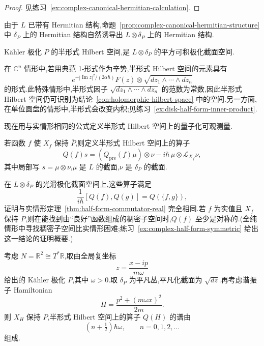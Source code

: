 \begin{proof}
见练习~\ref{ex:complex-canonical-hermitian-calculation}.
\end{proof}

由于 $L$ 已带有 Hermitian 结构,命题~\ref{prop:complex-canonical-hermitian-structure} 中 $\delta_P$ 上的 Hermitian 结构自然诱导出 $L\otimes\delta_P$ 上的 Hermitian 结构.

\begin{definition}
\label{def:half-form-hilbert-space-complex}
Kähler 极化 $P$ 的半形式 Hilbert 空间,是 $L\otimes\delta_P$ 的平方可积极化截面空间.
\end{definition}

在 $\mathbb C^n$ 情形中,若用典范 1-形式作为辛势,半形式 Hilbert 空间的元素具有
\[
 e^{-|\operatorname{Im}z|^2/(2\alpha\hbar)}F(z)\otimes
 \sqrt{dz_1\wedge\cdots\wedge dz_n}
\]
的形式.此特殊情形中,半形式因子 $\sqrt{dz_1\wedge\cdots\wedge dz_n}$ 的范数为常数,因此半形式 Hilbert 空间仍可识别为结论~\ref{con:holomorphic-hilbert-space} 中的空间.另一方面,在单位圆盘的情形中,半形式会改变内积;见练习~\ref{ex:disk-half-form-inner-product}.

现在用与实情形相同的公式定义半形式 Hilbert 空间上的量子化可观测量.

\begin{definition}
\label{def:half-form-quantum-operator-complex}
若函数 $f$ 使 $X_f$ 保持 $\overline P$,则定义半形式 Hilbert 空间上的算子
\[
 Q(f)s=(Q_{\mathrm{pre}}(f)\mu)\otimes\nu
 -i\hbar\,\mu\otimes\mathcal L_{X_f}\nu,
 \label{eq:half-form-quantum-operator-complex}
\]
其中局部写 $s=\mu\otimes\nu$,$\mu$ 是 $L$ 的截面,$\nu$ 是 $\delta_P$ 的截面.
\end{definition}

在 $L\otimes\delta_P$ 的光滑极化截面空间上,这些算子满足
\[
 \frac1{i\hbar}[Q(f),Q(g)]=Q(\{f,g\}),
\]
证明与实情形定理~\ref{thm:half-form-commutator-real} 完全相同.若 $f$ 为实值且 $X_f$ 保持 $\overline P$,则在能找到由“良好”函数组成的稠密子空间时,$Q(f)$ 至少是对称的.(全纯情形中寻找稠密子空间比实情形困难;练习~\ref{ex:complex-half-form-symmetric} 给出这一结论的证明概要.)

\begin{example}[半形式修正的量子谐振子]
\label{ex:half-form-harmonic-oscillator}
考虑 $N=\mathbb R^2\cong T^*\mathbb R$,取由全局复坐标
\[
 z=\frac{x-ip}{m\omega}
\]
给出的 Kähler 极化 $P$,其中 $\omega>0$.取 $\delta_P$ 为平凡丛,平凡化截面为 $\sqrt{dz}$.再考虑谐振子 Hamiltonian
\[
 H=\frac{p^2+(m\omega x)^2}{2m}.
\]
则 $X_H$ 保持 $P$,半形式 Hilbert 空间上的算子 $Q(H)$ 的谱由
\[
 (n+\tfrac12)\hbar\omega,\qquad n=0,1,2,\ldots
\]
组成.
\end{example}

